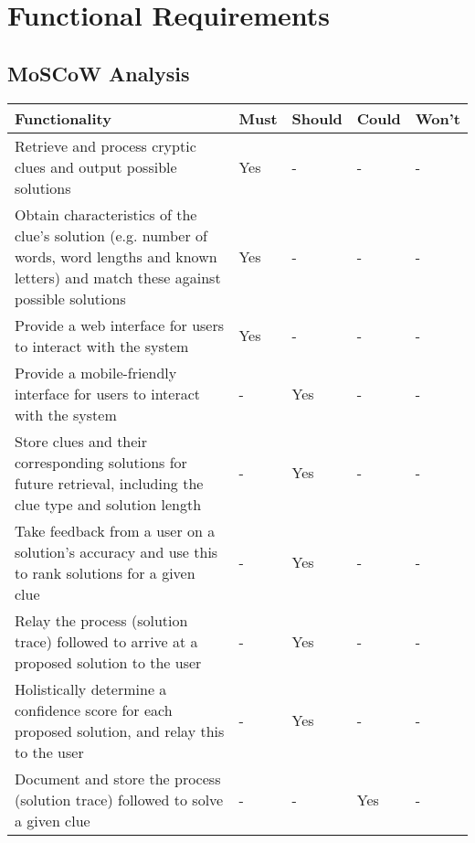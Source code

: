 \section{Functional Requirements}

\subsection{MoSCoW Analysis}

\begin{table}[H]
  \centering
  \small
    \begin{tabular}{|p{9.3cm}|p{1.3cm}|p{1.3cm}|p{1.3cm}|p{1.3cm}|}
    \hline
    \textbf{Functionality} & \textbf{Must} & \textbf{Should} & \textbf{Could} & \textbf{Won't} \\ \hline

    Retrieve and process cryptic clues and output possible solutions &
    Yes & - & - & - \\ \hline

    Obtain characteristics of the clue's solution (e.g. number of words, word lengths and known letters) and match these against possible solutions &
    Yes & - & - & - \\ \hline

    Provide a web interface for users to interact with the system &
    Yes & - & - & - \\ \hline

    Provide a mobile-friendly interface for users to interact with the system &
    - & Yes & - & - \\ \hline

    Store clues and their corresponding solutions for future retrieval, including the clue type and solution length &
    - & Yes & - & - \\ \hline

    Take feedback from a user on a solution's accuracy and use this to rank solutions for a given clue &
    - & Yes & - & - \\ \hline

    Relay the process (solution trace) followed to arrive at a proposed solution to the user &
    - & Yes & - & - \\ \hline

    Holistically determine a confidence score for each proposed solution, and relay this to the user &
    - & Yes & - & - \\ \hline

    Document and store the process (solution trace) followed to solve a given clue &
    - & - & Yes & - \\ \hline


\end{tabular}
\end{table}
